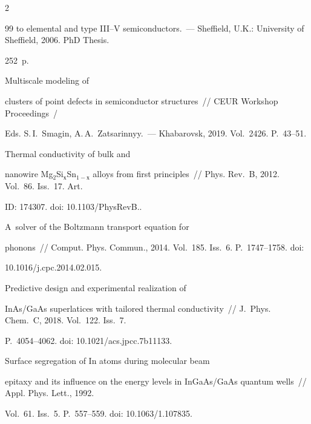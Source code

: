 \begin{multicols}{2}
{{\begin{thebibliography}{99}
to elemental and type III--V semiconductors.~--- Sheffield, U.K.: University of Sheffield, 2006. PhD Thesis. 


252~p.




      Multiscale modeling of 


clusters of point defects in semiconductor structures~// CEUR Workshop Proceedings~/


Eds. S.\,I.~Smagin, A.\,A.~Zatsarinnyy.~--- Khabarovsk, 2019. Vol.~2426. P.~43--51.




      Thermal conductivity of bulk and 


nanowire Mg$_2$Si$_х$Sn$_{1-х}$ alloys from first principles~// Phys. Rev.~B, 2012. Vol.~86. Iss.~17. Art. 


ID: 174307. doi: 10.1103/\mbox{PhysRevB}..




      A~solver of the Boltzmann transport equation for 


phonons~// Comput. Phys. Commun., 2014. Vol.~185. Iss.~6. P.~1747--1758. doi: 


10.1016/j.cpc.2014.02.015.




      Predictive design and experimental realization of 


InAs/GaAs superlatices with tailored thermal conductivity~// J.~Phys. Chem.~C, 2018. Vol.~122. Iss.~7.  


P.~4054--4062. doi: 10.1021/acs.jpcc.7b11133.




 Surface segregation of In atoms during molecular beam 


epitaxy and its influence on the energy levels in InGaAs/GaAs quantum wells~// Appl. Phys. Lett., 1992. 


Vol.~61. Iss.~5. P.~557--559. doi: 10.1063/1.107835.


\end{thebibliography}





 }


 }





\end{multicols}






